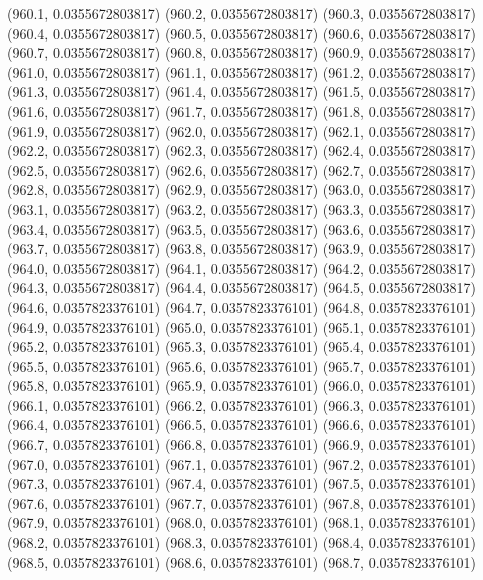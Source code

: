 {					(960.1, 0.0355672803817)
					(960.2, 0.0355672803817)
					(960.3, 0.0355672803817)
					(960.4, 0.0355672803817)
					(960.5, 0.0355672803817)
					(960.6, 0.0355672803817)
					(960.7, 0.0355672803817)
					(960.8, 0.0355672803817)
					(960.9, 0.0355672803817)
					(961.0, 0.0355672803817)
					(961.1, 0.0355672803817)
					(961.2, 0.0355672803817)
					(961.3, 0.0355672803817)
					(961.4, 0.0355672803817)
					(961.5, 0.0355672803817)
					(961.6, 0.0355672803817)
					(961.7, 0.0355672803817)
					(961.8, 0.0355672803817)
					(961.9, 0.0355672803817)
					(962.0, 0.0355672803817)
					(962.1, 0.0355672803817)
					(962.2, 0.0355672803817)
					(962.3, 0.0355672803817)
					(962.4, 0.0355672803817)
					(962.5, 0.0355672803817)
					(962.6, 0.0355672803817)
					(962.7, 0.0355672803817)
					(962.8, 0.0355672803817)
					(962.9, 0.0355672803817)
					(963.0, 0.0355672803817)
					(963.1, 0.0355672803817)
					(963.2, 0.0355672803817)
					(963.3, 0.0355672803817)
					(963.4, 0.0355672803817)
					(963.5, 0.0355672803817)
					(963.6, 0.0355672803817)
					(963.7, 0.0355672803817)
					(963.8, 0.0355672803817)
					(963.9, 0.0355672803817)
					(964.0, 0.0355672803817)
					(964.1, 0.0355672803817)
					(964.2, 0.0355672803817)
					(964.3, 0.0355672803817)
					(964.4, 0.0355672803817)
					(964.5, 0.0355672803817)
					(964.6, 0.0357823376101)
					(964.7, 0.0357823376101)
					(964.8, 0.0357823376101)
					(964.9, 0.0357823376101)
					(965.0, 0.0357823376101)
					(965.1, 0.0357823376101)
					(965.2, 0.0357823376101)
					(965.3, 0.0357823376101)
					(965.4, 0.0357823376101)
					(965.5, 0.0357823376101)
					(965.6, 0.0357823376101)
					(965.7, 0.0357823376101)
					(965.8, 0.0357823376101)
					(965.9, 0.0357823376101)
					(966.0, 0.0357823376101)
					(966.1, 0.0357823376101)
					(966.2, 0.0357823376101)
					(966.3, 0.0357823376101)
					(966.4, 0.0357823376101)
					(966.5, 0.0357823376101)
					(966.6, 0.0357823376101)
					(966.7, 0.0357823376101)
					(966.8, 0.0357823376101)
					(966.9, 0.0357823376101)
					(967.0, 0.0357823376101)
					(967.1, 0.0357823376101)
					(967.2, 0.0357823376101)
					(967.3, 0.0357823376101)
					(967.4, 0.0357823376101)
					(967.5, 0.0357823376101)
					(967.6, 0.0357823376101)
					(967.7, 0.0357823376101)
					(967.8, 0.0357823376101)
					(967.9, 0.0357823376101)
					(968.0, 0.0357823376101)
					(968.1, 0.0357823376101)
					(968.2, 0.0357823376101)
					(968.3, 0.0357823376101)
					(968.4, 0.0357823376101)
					(968.5, 0.0357823376101)
					(968.6, 0.0357823376101)
					(968.7, 0.0357823376101)
}
